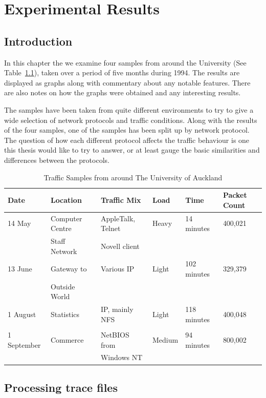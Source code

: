 \chapter{Experimental Results}
\label{results}

\section{Introduction}

In this chapter the we examine four samples from around the University
(See Table~\ref{results:sampletable}), taken over a period of five
months during 1994.  The results are displayed as graphs along with
commentary about any notable features.  There are also notes on how
the graphs were obtained and any interesting results.

The samples have been taken from quite different environments to try
to give a wide selection of network protocols and traffic conditions.
Along with the results of the four samples, one of the samples has
been split up by network protocol.  The question of how each different
protocol affects the traffic behaviour is one this thesis would like
to try to answer, or at least gauge the basic similarities and
differences between the protocols.

\begin{table}
{\small \begin{tabular}{|l|l|l|l|l|l|} \hline
Date & Location & Traffic Mix & Load & Time & Packet Count \\ \hline \hline
14 May & Computer Centre & AppleTalk, Telnet & Heavy & 14 minutes & 400,021 \\
 & Staff Network & Novell client & & & \\ \hline
13 June & Gateway to & Various IP & Light & 102 minutes & 329,379 \\
 & Outside World & & & & \\ \hline 
1 August & Statistics & IP, mainly NFS & Light & 118 minutes & 400,048 \\
 & & & & & \\ \hline
1 September & Commerce & NetBIOS from & Medium & 94 minutes & 800,002 \\
 & & Windows NT & & & \\ \hline
\end{tabular}}
\caption{Traffic Samples from around The University of Auckland}
\label{results:sampletable}
\end{table}

\section{Processing trace files}

